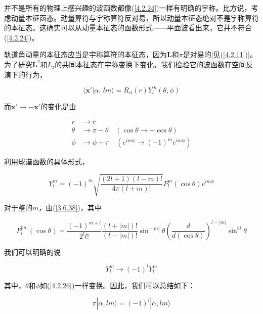 \documentclass[UTF8,twoside]{ctexart}
\begin{document}
并不是所有的物理上感兴趣的波函数都像(\ref{4.2.24})一样有明确的宇称。比方说，考虑动量本征函态。动量算符与宇称算符反对易，所以动量本征态绝对不是宇称算符的本征态。这确实可以从动量本征态的函数形式——平面波看出来，它并不符合(\ref{4.2.24})。

轨道角动量的本征态应当是宇称算符的本征态，因为$\bm{L}$和$\pi$是对易的[见(\ref{4.2.11})]。为了研究$\bm{L}^2$和$L_z$的共同本征态在宇称变换下变化，我们检验它的波函数在空间反演下的行为，

\begin{equation}
\langle\bm{x}'|\alpha,\, lm\rangle = R_{\alpha}(r)Y_l^m (\theta, \phi)
\end{equation}

\noindent 而$\bm{x}' \rightarrow -\bm{x}'$的变化是由

\begin{equation} \label{4.2.26}
\begin{split}
r&\rightarrow r\\
\theta&\rightarrow \pi - \theta\quad(\cos\theta\rightarrow-\cos\theta)\\
\phi&\rightarrow\phi+\pi\quad\left(e^{im\phi}\rightarrow(-1)^me^{im\phi}\right)
\end{split}
\end{equation}

利用球谐函数的具体形式，

\begin{equation}
Y_l^m = (-1)^m\sqrt{\frac{(2l+1)(l-m)!}{4\pi(l+m)!}}P_l^m(\cos\theta)e^{im\phi}
\end{equation}

\noindent 对于整的$m$，由(\ref{3.6.38})，其中

\begin{equation}
P_l^{|m|}(\cos\theta) = \frac{(-1)^{m+l}}{2^ll!}\frac{(l+|m|)!}{(l-|m|)!}\sin^{-|m|}\theta\left(\frac{d}{d(\cos\theta)}\right)^{l-|m|}\sin^{2l}\theta
\end{equation}

\noindent 我们可以明确的说

\begin{equation}
Y_l^m \rightarrow (-1)^lY_l^m
\end{equation}

\noindent 其中，$\theta$和$\phi$如(\ref{4.2.26})一样变换。因此，我们可以总结如下：

\begin{equation}
\pi|\alpha, lm\rangle = (-1)^l |\alpha, lm\rangle
\end{equation}
\end{document}
